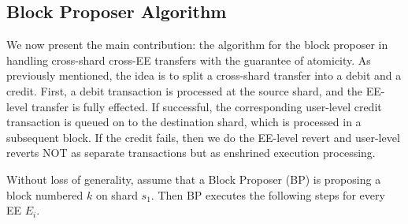 \documentclass{article}
\begin{document}
\subsection{Block Proposer Algorithm}
\label{sec:BP}
We now present the main contribution: the algorithm for the block proposer in handling cross-shard cross-EE transfers with the guarantee of atomicity. As previously mentioned, the idea is to split a cross-shard transfer into a debit and a credit. First, a debit transaction is processed at the source shard, and the EE-level transfer is fully effected. If successful, the corresponding user-level credit transaction is queued on to the destination shard, which is processed in a subsequent block. If the credit fails, then we do the EE-level revert and user-level reverts NOT as separate transactions but as enshrined execution processing. 

Without loss of generality, assume that a Block Proposer (BP) is proposing a block numbered $k$ on shard $s_1$. Then BP executes the following steps for every EE $E_i$. 
\end{document}
